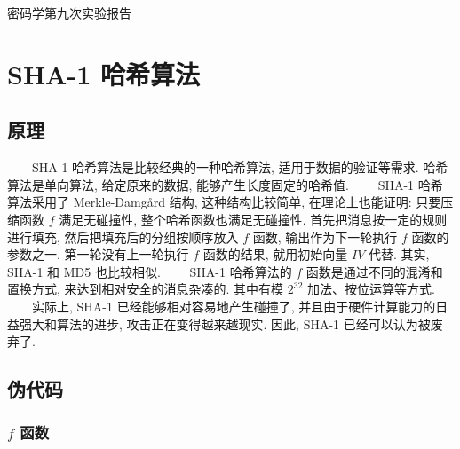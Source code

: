 \documentclass[12pt,a4paper]{article}
\begin{document}
{
\titlefont
\begin{center}
密码学第九次实验报告
\end{center}
}

\section*{SHA-1 哈希算法}

\subsection*{原理}

　　SHA-1 哈希算法是比较经典的一种哈希算法, 适用于数据的验证等需求. 哈希算法是单向算法, 给定原来的数据, 能够产生长度固定的哈希值. 
\newline
　　SHA-1 哈希算法采用了 Merkle-Damgård 结构, 这种结构比较简单, 在理论上也能证明: 只要压缩函数 $ f $ 满足无碰撞性, 整个哈希函数也满足无碰撞性. 首先把消息按一定的规则进行填充, 然后把填充后的分组按顺序放入 $ f $ 函数, 输出作为下一轮执行 $ f $ 函数的参数之一. 第一轮没有上一轮执行 $ f $ 函数的结果, 就用初始向量 $ IV $ 代替. 其实, SHA-1 和 MD5 也比较相似. 
\newline
　　SHA-1 哈希算法的 $ f $ 函数是通过不同的混淆和置换方式, 来达到相对安全的消息杂凑的. 其中有模 $ \mathrm{2^{32}} $ 加法、按位运算等方式. 
\newline
　　实际上, SHA-1 已经能够相对容易地产生碰撞了, 并且由于硬件计算能力的日益强大和算法的进步, 攻击正在变得越来越现实. 因此, SHA-1 已经可以认为被废弃了. 

\subsection*{伪代码}

\subsubsection*{$ f $ 函数}
\end{document}
